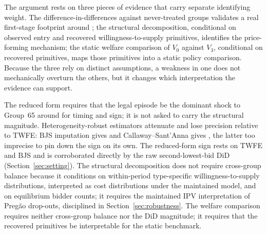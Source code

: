 The argument rests on three pieces of evidence that carry separate
identifying weight. The difference-in-differences against
\controlGroupCount{} never-treated groups validates a real first-stage
footprint around \policyCutoffMonth{}; the structural decomposition,
conditional on observed entry and recovered willingness-to-supply
primitives, identifies the price-forming mechanism; the static welfare
comparison of $V_0$ against $V_3$, conditional on recovered primitives,
maps those primitives into a static policy comparison. Because the three
rely on distinct assumptions, a weakness in one does not mechanically
overturn the others, but it changes which interpretation the evidence can
support.

The reduced form requires that the legal episode be the dominant shock to
Group~65 around \policyCutoffMonth{} for timing and sign; it is not asked
to carry the structural magnitude. Heterogeneity-robust
estimators attenuate and lose precision relative to TWFE: BJS imputation
gives \didAltBjsEst{} and Callaway--Sant'Anna gives \didAltCsEst{}, the
latter too imprecise to pin down the sign on its own. The reduced-form
sign rests on TWFE and BJS and is corroborated directly by the raw
second-lowest-bid DiD (Section~\ref{sec:setting}). The structural
decomposition does not
require cross-group balance because it conditions on within-period
type-specific willingness-to-supply distributions, interpreted as cost
distributions under the maintained model, and on equilibrium bidder
counts; it requires the maintained IPV interpretation of Preg\~ao
drop-outs, disciplined in Section~\ref{sec:robustness}. The welfare
comparison requires neither cross-group balance nor the DiD magnitude; it
requires that the recovered primitives be interpretable for the static
benchmark.

